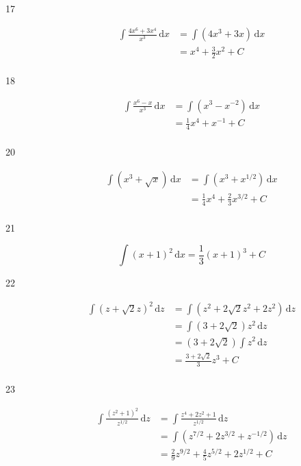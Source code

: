\documentclass{exam}
\begin{document}
\begin{description}
\item[17]
\begin{align*}
  \int \frac{4x^6 + 3x^4}{x^3} \, \mathrm{d}x &= \int \left( 4x^3 + 3x \right) \, \mathrm{d}x \\ 
  &= x^4 + \frac{3}{2} x^2 + C \\
\end{align*}

\item[18]
\begin{align*}
  \int \frac{x^6 - x}{x^3} \, \mathrm{d}x &= \int \left( x^3 - x^{-2} \right) \, \mathrm{d}x \\
  &= \frac{1}{4} x^4 + x^{-1} + C \\
\end{align*}

\item[20]
\begin{align*}
  \int \left(x^3 + \sqrt{x} \right) \, \mathrm{d}x &= \int \left( x^3 + x^{1/2} \right) \, \mathrm{d}x \\
  &= \frac{1}{4} x^4 + \frac{2}{3} x^{3/2} + C \\
\end{align*}

\item[21]
\[
  \int (x + 1)^2 \, \mathrm{d}x = \frac{1}{3} (x + 1)^3 + C
\]


\item[22]
\begin{align*}
  \int (z + \sqrt{2} z)^2 \, \mathrm{d}z &= \int (z^2 + 2 \sqrt{2} z^2 + 2z^2) \, \mathrm{d}z \\
  &= \int (3 + 2 \sqrt{2}) z^2 \, \mathrm{d}z \\
  &= (3 + 2 \sqrt{2}) \int z^2 \, \mathrm{d}z \\
  &= \frac{3 + 2 \sqrt{2}}{3} z^3 + C \\
\end{align*}

\item[23]
\begin{align*}
  \int \frac{(z^2 + 1)^2}{z^{1/2}} \, \mathrm{d}z &= \int \frac{z^4 + 2z^2 + 1}{z^{1/2}} \, \mathrm{d}z \\
  &= \int \left( z^{7/2} + 2z^{3/2} + z^{-1/2} \right) \, \mathrm{d}z \\
  &= \frac{2}{9} z^{9/2} + \frac{4}{5} z^{5/2} + 2 z^{1/2} + C \\
\end{align*}


\end{description}
\end{document}
